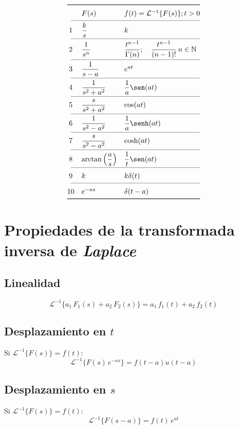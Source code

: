 \begin{equation*}
\def\arraystretch{1.4}
\begin{array}{@{}cll@{}}
\toprule
 & F(s) & f(t)=\mathcal{L}^{-1}\{F(s)\};t>0\\
\cmidrule(l){1-3}
 1 & \dfrac{k}{s}
   & k\\
\cmidrule(l){1-3}
 2 & \dfrac{1}{s^n}
   & \dfrac{t^{n-1}}{\Gamma(n)};\quad\dfrac{t^{n-1}}{(n-1)!}\,n\in\mathbb{N}\\
\cmidrule(l){1-3}
 3 & \dfrac{1}{s-a}
   & e^{at}\\
\cmidrule(l){1-3}
 4 & \dfrac{1}{s^2+a^2}
   & \dfrac{1}{a}\sen(at)\\
\cmidrule(l){1-3}
 5 & \dfrac{s}{s^2+a^2}
   & \cos(at)\\
\cmidrule(l){1-3}
 6 & \dfrac{1}{s^2-a^2}
   & \dfrac{1}{a}\senh(at)\\
\cmidrule(l){1-3}
 7 & \dfrac{s}{s^2-a^2}
   & \cosh(at)\\
\cmidrule(l){1-3}
 8 & \arctan\left(\dfrac{a}{s}\right)
   & \dfrac{1}{t}\sen(at)\\
\cmidrule(l){1-3}
 9 & k
   & k\delta(t)\\
\cmidrule(l){1-3}
10 & e^{-as}
   & \delta(t-a)\\
\bottomrule
\end{array}
\end{equation*}

\section{Propiedades de la transformada inversa de \emph{Laplace}}

\subsection{Linealidad}
\begin{equation}
    \mathcal{L}^{-1}\{a_1\,F_1(s)+a_2\,F_2(s)\}
    =a_1\,f_1(t)+a_2\,f_2(t)
\end{equation}

\subsection{Desplazamiento en $t$}
Si $\mathcal{L}^{-1}\{F(s)\}=f(t)$:
\begin{equation}
    \mathcal{L}^{-1}\{F(s)\,e^{-as}\}=f(t-a)u(t-a)
\end{equation}

\subsection{Desplazamiento en $s$}
Si $\mathcal{L}^{-1}\{F(s)\}=f(t)$:
\begin{equation}
    \mathcal{L}^{-1}\{F(s-a)\}=f(t)\,e^{at}
\end{equation}

